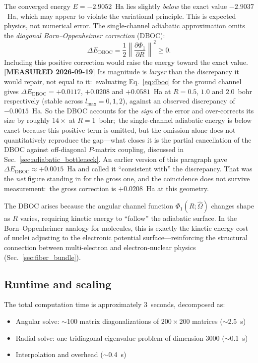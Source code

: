 \documentclass[aps,pra,twocolumn,superscriptaddress,longbibliography]{revtex4-2}
\begin{document}
The converged energy $E = -2.9052$~Ha lies slightly \emph{below} the
exact value $-2.9037$~Ha, which may appear to violate the
variational principle.  This is expected physics, not numerical
error.  The single-channel adiabatic approximation omits the
\emph{diagonal Born--Oppenheimer correction} (DBOC):
\begin{equation}
  \Delta E_{\mathrm{DBOC}}
  = \frac{1}{2}\left\lVert\frac{\partial\Phi_1}{\partial R}
  \right\rVert^2 \geq 0.
  \label{eq:dboc}
\end{equation}
Including this positive correction would raise the energy toward the
exact value.  \textbf{[MEASURED 2026-09-19]} Its magnitude is
\emph{larger} than the discrepancy it would repair, not equal to it:\
evaluating Eq.~\eqref{eq:dboc} for the ground channel gives
$\Delta E_{\mathrm{DBOC}} = +0.0117$, $+0.0208$ and $+0.0581$~Ha at
$R = 0.5$, $1.0$ and $2.0$~bohr respectively (stable across
$l_{\max} = 0, 1, 2$), against an observed discrepancy of
$-0.0015$~Ha.  So the DBOC accounts for the \emph{sign} of the error
and over-corrects its size by roughly $14\times$ at $R = 1$~bohr;\ the
single-channel adiabatic energy is below exact because this positive
term is omitted, but the omission alone does not quantitatively
reproduce the gap---what closes it is the partial cancellation of the
DBOC against off-diagonal $P$-matrix coupling, discussed in
Sec.~\ref{sec:adiabatic_bottleneck}.  An earlier version of this
paragraph gave $\Delta E_{\mathrm{DBOC}} \approx +0.0015$~Ha and
called it ``consistent with'' the discrepancy.  That was the
\emph{net} figure standing in for the gross one, and the coincidence
does not survive measurement:\ the gross correction is
$+0.0208$~Ha at this geometry.

The DBOC arises because the angular channel function $\Phi_1(R;
\hat{\Omega})$ changes shape as $R$ varies, requiring kinetic
energy to ``follow'' the adiabatic surface.  In the Born--Oppenheimer
analogy for molecules, this is exactly the kinetic energy cost of
nuclei adjusting to the electronic potential surface---reinforcing
the structural connection between multi-electron and electron-nuclear
physics (Sec.~\ref{sec:fiber_bundle}).

\subsection{Runtime and scaling}

The total computation time is approximately 3~seconds, decomposed as:
\begin{itemize}
  \item Angular solve: $\sim$100 matrix diagonalizations of
    $200\times 200$ matrices ($\sim$2.5~s)
  \item Radial solve: one tridiagonal eigenvalue problem of
    dimension 3000 ($\sim$0.1~s)
  \item Interpolation and overhead ($\sim$0.4~s)
\end{itemize}
\end{document}
